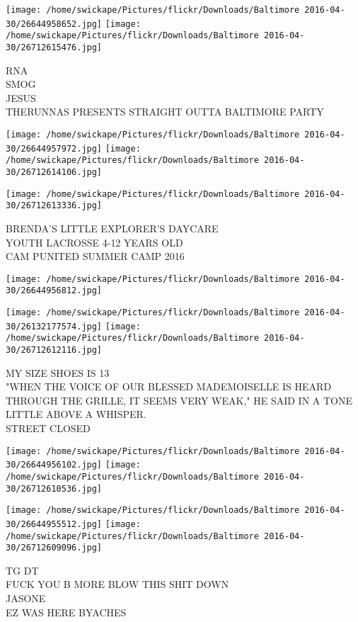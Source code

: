 \documentclass[10pt,letterpaper]{article}
\begin{document}
\texttt{[image: /home/swickape/Pictures/flickr/Downloads/Baltimore 2016-04-30/26644958652.jpg]}
\texttt{[image: /home/swickape/Pictures/flickr/Downloads/Baltimore 2016-04-30/26712615476.jpg]}

RNA\\
SMOG\\
JESUS\\
THERUNNAS PRESENTS STRAIGHT OUTTA BALTIMORE PARTY
\pagebreak

\texttt{[image: /home/swickape/Pictures/flickr/Downloads/Baltimore 2016-04-30/26644957972.jpg]}
\texttt{[image: /home/swickape/Pictures/flickr/Downloads/Baltimore 2016-04-30/26712614106.jpg]}

\texttt{[image: /home/swickape/Pictures/flickr/Downloads/Baltimore 2016-04-30/26712613336.jpg]}

BRENDA'S LITTLE EXPLORER'S DAYCARE\\
YOUTH LACROSSE 4{-}12 YEARS OLD\\
CAM PUNITED SUMMER CAMP 2016
\pagebreak

\texttt{[image: /home/swickape/Pictures/flickr/Downloads/Baltimore 2016-04-30/26644956812.jpg]}

\vspace{0.25in}
\texttt{[image: /home/swickape/Pictures/flickr/Downloads/Baltimore 2016-04-30/26132177574.jpg]}
\texttt{[image: /home/swickape/Pictures/flickr/Downloads/Baltimore 2016-04-30/26712612116.jpg]}

MY SIZE SHOES IS 13\\
"WHEN THE VOICE OF OUR BLESSED MADEMOISELLE IS HEARD THROUGH THE GRILLE, IT SEEMS VERY WEAK," HE SAID IN A TONE LITTLE ABOVE A WHISPER.\\
STREET CLOSED
\pagebreak

\texttt{[image: /home/swickape/Pictures/flickr/Downloads/Baltimore 2016-04-30/26644956102.jpg]}
\texttt{[image: /home/swickape/Pictures/flickr/Downloads/Baltimore 2016-04-30/26712610536.jpg]}

\texttt{[image: /home/swickape/Pictures/flickr/Downloads/Baltimore 2016-04-30/26644955512.jpg]}
\texttt{[image: /home/swickape/Pictures/flickr/Downloads/Baltimore 2016-04-30/26712609096.jpg]}

TG DT\\
FUCK YOU B MORE BLOW THIS SHIT DOWN\\
JASONE\\
EZ WAS HERE BYACHES
\pagebreak
\end{document}
